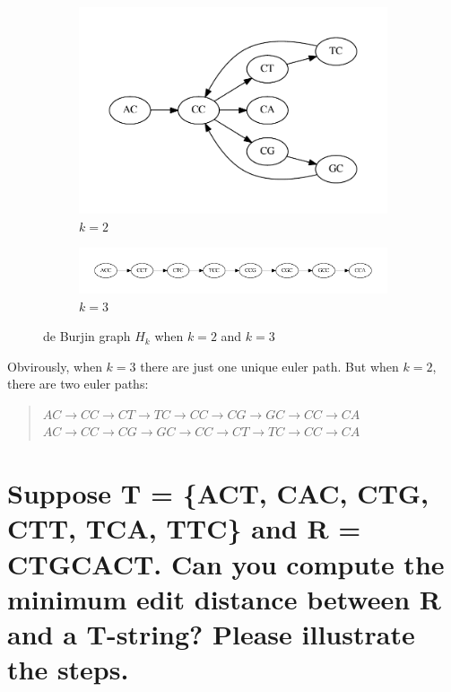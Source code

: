 \documentclass{article}
\begin{document}
\begin{figure}[h]
    \begin{subfigure}[h]{0.35\linewidth}
        \includegraphics[width=\linewidth]{./img/q2-k2.pdf}
        \caption{$k=2$}
    \end{subfigure}
    \begin{subfigure}[h]{0.65\linewidth}
        \includegraphics[width=\linewidth]{./img/q2-k3.pdf}
        \caption[b]{$k=3$}
    \end{subfigure}
    \caption{de Burjin graph $H_k$ when $k=2$ and $k=3$}
    \label{fig:q2}
\end{figure}

Obvirously, when $k=3$ there are just one unique euler path.
But when $k=2$, there are two euler paths:

\begin{quote}
    $AC \rightarrow CC \rightarrow CT \rightarrow TC \rightarrow CC \rightarrow CG \rightarrow GC \rightarrow CC \rightarrow CA$ \\
    $AC \rightarrow CC \rightarrow CG \rightarrow GC \rightarrow CC \rightarrow CT \rightarrow TC \rightarrow CC \rightarrow CA$ 
\end{quote}

\section{Suppose T = \{ACT, CAC, CTG, CTT, TCA, TTC\} and R = CTGCACT. Can
you compute the minimum edit distance between R and a T-string? Please
illustrate the steps.}
\end{document}
